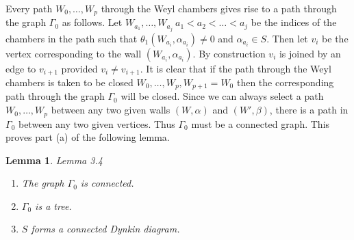 \documentclass{memo-l}
\newtheorem{lemma}[theorem]{Lemma}
\theoremstyle{definition}
\theoremstyle{remark}
\numberwithin{section}{chapter}
\numberwithin{equation}{chapter}
\begin{document}
   Every path $W_{0},\ldots ,W_{p}$ through the Weyl chambers gives rise to
a path through the graph ${\Gamma}_{0}$ as follows.  Let $W_{a_1},\ldots ,
W_{a_j} \ a_{1} < a_{2} < \ldots < a_{j}$ be the indices of
the chambers in the path such that ${\theta}_{1}(W_{a_{i}},{\alpha}_{a_{i}})
\ne 0$ and ${\alpha}_{a_{i}}  \in  S$.  Then
let $v_{i}$ be the vertex corresponding to the wall $(W_{a_{i}},
{\alpha}_{a_{i}})$.  By construction $v_{i}$ is joined by an edge
to $v_{i+1}$ provided $v_{i}\ne v_{i+1}$.  It is clear that if the path
through the Weyl chambers is taken to be closed $W_{0},\ldots ,
W_{p},W_{p+1} = W_{0}$ then the corresponding path through the graph
${\Gamma}_{0}$ will be closed.  Since we can always select a path
$W_{0},\ldots ,W_{p}$ between any two given walls $(W,{\alpha})$ and
$(W',{\beta})$, there is a path in ${\Gamma}_{0}$ between any two given
vertices.  Thus ${\Gamma}_{0}$ must be a connected graph.  This proves part
(a) of the following lemma.

\medskip

\begin{lemma}{Lemma 3.4}   
\begin{enumerate}[label=\alph*)]
\item The graph ${\Gamma}_{0}$ is connected.
\item ${\Gamma}_{0}$ is a tree.
\item $S$ forms a connected Dynkin diagram.
\end{enumerate}
\end{lemma}

\medskip
\end{document}
